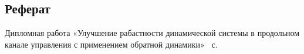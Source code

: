 
\newpage
\begin{center}
    \section*{Реферат}
\end{center}

Дипломная работа «Улучшение рабастности динамической системы в продольном канале управления с применением обратной динамики» \pageref{lastPage}~с.
